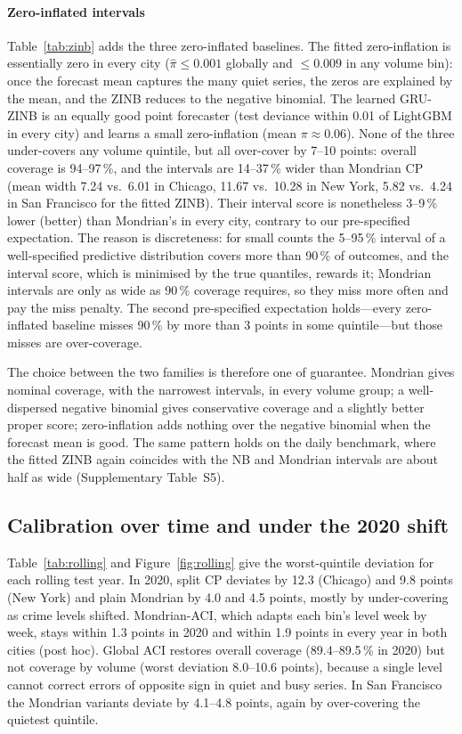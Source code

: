 \documentclass[preprint,12pt,authoryear]{elsarticle}
\begin{document}
\paragraph{Zero-inflated intervals} Table~\ref{tab:zinb} adds the three zero-inflated baselines. The fitted zero-inflation is essentially zero in every city ($\hat\pi\le0.001$ globally and $\le0.009$ in any volume bin): once the forecast mean captures the many quiet series, the zeros are explained by the mean, and the ZINB reduces to the negative binomial. The learned GRU-ZINB is an equally good point forecaster (test deviance within 0.01 of LightGBM in every city) and learns a small zero-inflation (mean $\pi\approx0.06$). None of the three under-covers any volume quintile, but all over-cover by 7--10 points: overall coverage is 94--97\,\%, and the intervals are 14--37\,\% wider than Mondrian CP (mean width 7.24 vs.\ 6.01 in Chicago, 11.67 vs.\ 10.28 in New York, 5.82 vs.\ 4.24 in San Francisco for the fitted ZINB). Their interval score is nonetheless 3--9\,\% lower (better) than Mondrian's in every city, contrary to our pre-specified expectation. The reason is discreteness: for small counts the 5--95\,\% interval of a well-specified predictive distribution covers more than 90\,\% of outcomes, and the interval score, which is minimised by the true quantiles, rewards it; Mondrian intervals are only as wide as 90\,\% coverage requires, so they miss more often and pay the miss penalty. The second pre-specified expectation holds---every zero-inflated baseline misses 90\,\% by more than 3 points in some quintile---but those misses are over-coverage.

The choice between the two families is therefore one of guarantee. Mondrian gives nominal coverage, with the narrowest intervals, in every volume group; a well-dispersed negative binomial gives conservative coverage and a slightly better proper score; zero-inflation adds nothing over the negative binomial when the forecast mean is good. The same pattern holds on the daily benchmark, where the fitted ZINB again coincides with the NB and Mondrian intervals are about half as wide (Supplementary Table~S5).



\subsection{Calibration over time and under the 2020 shift}\label{sec:res-rolling}
Table~\ref{tab:rolling} and Figure~\ref{fig:rolling} give the worst-quintile deviation for each rolling test year. In 2020, split CP deviates by 12.3 (Chicago) and 9.8 points (New York) and plain Mondrian by 4.0 and 4.5 points, mostly by under-covering as crime levels shifted. Mondrian-ACI, which adapts each bin's level week by week, stays within 1.3 points in 2020 and within 1.9 points in every year in both cities (post hoc). Global ACI restores overall coverage (89.4--89.5\,\% in 2020) but not coverage by volume (worst deviation 8.0--10.6 points), because a single level cannot correct errors of opposite sign in quiet and busy series. In San Francisco the Mondrian variants deviate by 4.1--4.8 points, again by over-covering the quietest quintile.
\end{document}
